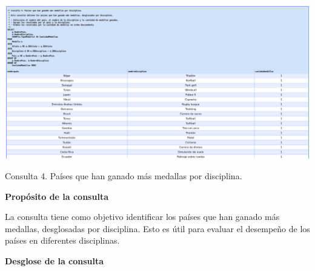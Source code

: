 \begin{center}
    \includegraphics[width=16.5cm]{resources/Chapters/Consultas/Imagenes/Consulta4.jpeg} 
    
   Consulta 4. Países que han ganado más medallas por disciplina.
\end{center}

\textbf{Propósito de la consulta}

La consulta tiene como objetivo identificar los países que han ganado más medallas, desglosadas por disciplina. Esto es útil para evaluar el desempeño de los países en diferentes disciplinas.

\textbf{Desglose de la consulta}

